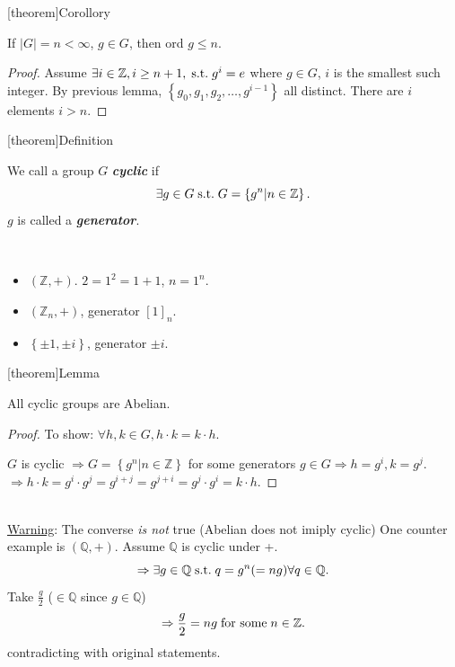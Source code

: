 \documentclass[12pt]{report}
\theoremstyle{definition}
\begin{document}
[theorem]{Corollory}
\begin{ord g <= n}
    If $|G| = n < \infty$, $g \in G$, then ord $g \le n$. %
\end{ord g <= n}

\begin{proof}
    Assume $\exists{}i \in{}\mathbb{Z}, i \ge{}n + 1, \;\textnormal{s.t.}\; g^{i} = e $
    where $g \in{}G$, $i$ is the smallest such integer.
    By previous lemma, $\left\{g_0, g_1, g_2, \ldots, g^{i-1}\right\} $ all distinct.
    There are $i$ elements $i > n$.
\end{proof}

[theorem]{Definition}
\begin{cyclic group}
    We call a group $G$ \textbf{\emph{cyclic}} if \[
        \exists g \in G \;\textnormal{s.t.}\; G = \left\{g^{n} | n \in \mathbb{Z}\right\}%
.\]
    $g$ is called a \textbf{\emph{generator}}.
\end{cyclic group}

\begin{ex}
    \,

    \begin{itemize}
        \item $(\mathbb{Z}, +)$.
            $2 = 1^{2} = 1 + 1$, $n = 1^{n}$.
        \item $(\mathbb{Z}_n, +)$, generator ${[1]}_{n}$.
        \item $\left\{\pm 1, \pm i\right\} $, generator $\pm i$.
    \end{itemize}
    
\end{ex}

[theorem]{Lemma}
\begin{cyclic groups are Abelian}
    All cyclic groups are Abelian.
\end{cyclic groups are Abelian}

\begin{proof}
    To show: $\forall h, k \in G, h \cdot k = k \cdot h$.

    $G$ is cyclic 
    $\Rightarrow{} G = \left\{g^{n} | n \in{}\mathbb{Z}\right\} $
    for some generators $g \in G \Rightarrow h = g^{i}, k = g^{j}$.
    \\$\Rightarrow{} h \cdot k = g^{i} \cdot g^{j} = g^{i + j} = g^{j + i} = g^{j} \cdot g^{i} = k \cdot h$.
\end{proof}
\\\underline{Warning}: The converse \emph{is not} true (Abelian does not imiply cyclic)
One counter example is $ (\mathbb{Q}, +)$.
Assume $\mathbb{Q}$ is cyclic under +. \[
    \Rightarrow \exists g \in \mathbb{Q} \;\textnormal{s.t.}\; q = g^{n} (= ng) \forall q \in \mathbb{Q}.
\]
Take $\frac{g}{2}$ ($\in \mathbb{Q}$ since $g \in \mathbb{Q}$)\[
    \Rightarrow \frac{g}{2} = ng \;\textnormal{for some}\; n \in \mathbb{Z}.
\]contradicting with original statements.
\end{document}
